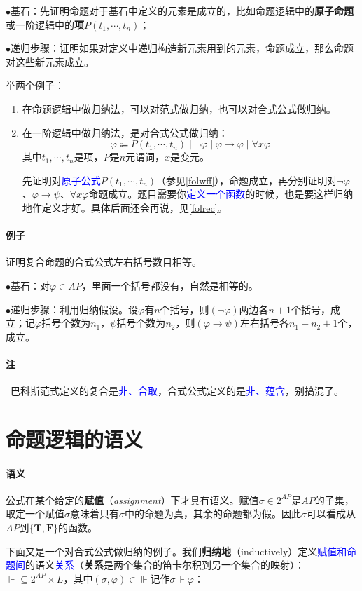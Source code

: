 \documentclass[b5paper,oneside]{ctexbook}
\newcommand{\Blue}[1]{\textcolor[named]{blue}{#1}}
\begin{document}
$\bullet$基石：先证明命题对于基石中定义的元素是成立的，比如命题逻辑中的\textbf{原子命题}或一阶逻辑中的\textbf{项}$P(t_1,\cdots ,t_n)$；

$\bullet$递归步骤：证明如果对定义中递归构造新元素用到的元素，命题成立，那么命题对这些新元素成立。

举两个例子：
\begin{enumerate}
\item 在命题逻辑中做归纳法，可以对范式做归纳，也可以对合式公式做归纳。
\item 在一阶逻辑中做归纳法，是对合式公式做归纳：
\[\varphi\Coloneqq P(t_1,\cdots ,t_n)\mid\neg\varphi\mid\varphi\rightarrow\varphi\mid\forall x\varphi\]
其中$t_1,\cdots,t_n$是项，$P$是$n$元谓词，$x$是变元。

先证明对\Blue{原子公式}$P(t_1,\cdots ,t_n)$（参见\ref{folwff}），命题成立，再分别证明对$\neg\varphi$、$\varphi\rightarrow\psi$、$\forall x\varphi$命题成立。题目需要你\Blue{定义一个函数}的时候，也是要这样归纳地作定义才好。具体后面还会再说，见\ref{folrec}。
\end{enumerate}
\paragraph{例子}证明复合命题的合式公式左右括号数目相等。

$\bullet$基石：对$\varphi\in AP$，里面一个括号都没有，自然是相等的。

$\bullet$递归步骤：利用归纳假设。设$\varphi$有$n$个括号，则$(\neg \varphi)$两边各$n+1$个括号，成立；记$\varphi$括号个数为$n_1$，$\psi$括号个数为$n_2$，则$(\varphi\rightarrow\psi)$左右括号各$n_1+n_2+1$个，成立。
\paragraph{注}\ 巴科斯范式定义的复合是\Blue{非、合取}，合式公式定义的是\Blue{非、蕴含}，别搞混了。
\section{命题逻辑的语义}
\paragraph{语义}公式在某个给定的\textbf{赋值}（\emph{assignment}）下才具有语义。赋值$\sigma\in 2^{AP}$是$AP$的子集，取定一个赋值$\sigma$意味着只有$\sigma$中的命题为真，其余的命题都为假。因此$\sigma$可以看成从$AP$到$\{\mathbf{T},\mathbf{F}\}$的函数。

下面又是一个对合式公式做归纳的例子。我们\textbf{归纳地}（inductively）定义\Blue{赋值和命题间}的语义\Blue{关系}（\textbf{关系}是两个集合的笛卡尔积到另一个集合的映射）：$\Vdash\subseteq 2^{AP}\times L$，其中$(\sigma,\varphi)\in\Vdash$记作$\sigma\Vdash\varphi$：
\end{document}
